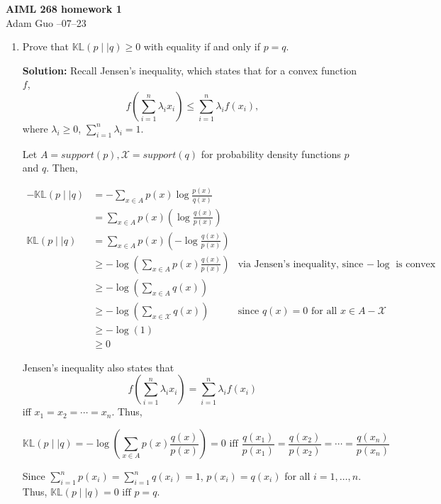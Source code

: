 \documentclass[11pt]{article}
\newenvironment{solution}{\vspace{0.16in} {\bf Solution:}}{\vspace{0.16in}}
\begin{document}
\begin{center}
    {\bf \Large AIML 268 homework 1} \\
    \vspace{0.1in}
    Adam Guo --07--23
\end{center}

\begin{enumerate}
    \item Prove that $\mathbb{KL}(p \mid\mid q) \geq 0$ with equality if and only if $p = q$.

    \begin{solution}
        Recall Jensen's inequality, which states that for a convex function $f$, \[f(\sum_{i=1}^n
        \lambda_i x_i) \leq \sum_{i=1}^n \lambda_i f(x_i),\] where $\lambda_i \geq 0$, $\sum_{i=1}^n
        \lambda_i = 1$.

        Let $A = support(p), \mathcal{X} = support(q)$ for probability density functions $p$ and
        $q$. Then,

        \begin{align*}
            -\mathbb{KL}(p \mid\mid q)
                &= -\sum_{x \in A} p(x) \log \frac{p(x)}{q(x)} \\
                &= \sum_{x \in A} p(x) (\log \frac{q(x)}{p(x)}) \\
            \mathbb{KL}(p \mid\mid q)
                &= \sum_{x \in A} p(x) (-\log \frac{q(x)}{p(x)}) \\
                &\geq -\log(\sum_{x \in A} p(x) \frac{q(x)}{p(x)}) & \text{via Jensen's inequality,
                since $-\log$ is convex} \\
                &\geq -\log(\sum_{x \in A} q(x)) \\
                &\geq -\log(\sum_{x \in \mathcal{X}} q(x)) & \text{since $q(x) = 0$ for all $x \in
                A - \mathcal{X}$} \\
                &\geq -\log(1) \\
                &\geq 0
        \end{align*}

        Jensen's inequality also states that \[f(\sum_{i=1}^n \lambda_i x_i) = \sum_{i=1}^n
        \lambda_i f(x_i)\] iff $x_1 = x_2 = \cdots = x_n$. Thus, 

        \[\mathbb{KL}(p \mid\mid q) = -\log(\sum_{x \in A} p(x) \frac{q(x)}{p(x)}) = 0 \text{ iff }
        \frac{q(x_1)}{p(x_1)} = \frac{q(x_2)}{p(x_2)} = \cdots = \frac{q(x_n)}{p(x_n)}\]

        Since $\sum_{i=1}^n p(x_i) = \sum_{i=1}^n q(x_i) = 1$, $p(x_i) = q(x_i)$ for all $i = 1,
        \dots, n$. Thus, $\mathbb{KL}(p \mid\mid q) = 0 \text{ iff } p = q$.
    \end{solution}


\end{enumerate}
\end{document}
